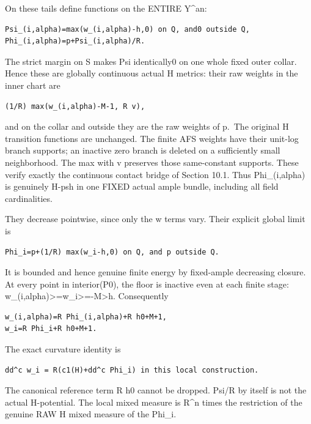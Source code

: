 \documentclass[
  10pt,
]{article}
\begin{document}
On these tails define functions on the ENTIRE Y\^{}an:

\begin{verbatim}
Psi_(i,alpha)=max(w_(i,alpha)-h,0) on Q, and0 outside Q,
Phi_(i,alpha)=p+Psi_(i,alpha)/R.
\end{verbatim}

The strict margin on S makes Psi identically0 on one whole fixed outer
collar. Hence these are globally continuous actual H metrics: their raw
weights in the inner chart are

\begin{verbatim}
(1/R) max(w_(i,alpha)-M-1, R v),
\end{verbatim}

and on the collar and outside they are the raw weights of p.~The
original H transition functions are unchanged. The finite AFS weights
have their unit-log branch supports; an inactive zero branch is deleted
on a sufficiently small neighborhood. The max with v preserves those
same-constant supports. These verify exactly the continuous contact
bridge of Section 10.1. Thus Phi\_(i,alpha) is genuinely H-psh in one
FIXED actual ample bundle, including all field cardinalities.

They decrease pointwise, since only the w terms vary. Their explicit
global limit is

\begin{verbatim}
Phi_i=p+(1/R) max(w_i-h,0) on Q, and p outside Q.
\end{verbatim}

It is bounded and hence genuine finite energy by fixed-ample decreasing
closure. At every point in interior(P0), the floor is inactive even at
each finite stage:
w\_(i,alpha)\textgreater=w\_i\textgreater=-M\textgreater h. Consequently

\begin{verbatim}
w_(i,alpha)=R Phi_(i,alpha)+R h0+M+1,
w_i=R Phi_i+R h0+M+1.
\end{verbatim}

The exact curvature identity is

\begin{verbatim}
dd^c w_i = R(c1(H)+dd^c Phi_i) in this local construction.
\end{verbatim}

The canonical reference term R h0 cannot be dropped. Psi/R by itself is
not the actual H-potential. The local mixed measure is R\^{}n times the
restriction of the genuine RAW H mixed measure of the Phi\_i.
\end{document}
